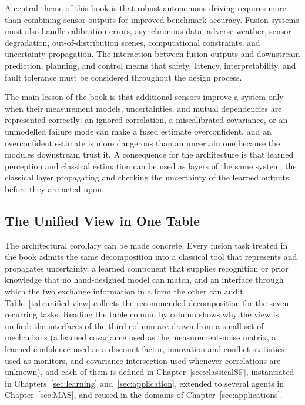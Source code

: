 A central theme of this book is that robust autonomous driving requires more than combining sensor outputs for improved benchmark accuracy. Fusion systems must also handle calibration errors, asynchronous data, adverse weather, sensor degradation, out-of-distribution scenes, computational constraints, and uncertainty propagation. The interaction between fusion outputs and downstream prediction, planning, and control means that safety, latency, interpretability, and fault tolerance must be considered throughout the design process.

The main lesson of the book is that additional sensors improve a system only when their measurement models, uncertainties, and mutual dependencies are represented correctly: an ignored correlation, a miscalibrated covariance, or an unmodelled failure mode can make a fused estimate overconfident, and an overconfident estimate is more dangerous than an uncertain one because the modules downstream trust it. A consequence for the architecture is that learned perception and classical estimation can be used as layers of the same system, the classical layer propagating and checking the uncertainty of the learned outputs before they are acted upon.

\subsection*{The Unified View in One Table}

The architectural corollary can be made concrete. Every fusion task treated in the book admits the same decomposition into a classical tool that represents and propagates uncertainty, a learned component that supplies recognition or prior knowledge that no hand-designed model can match, and an interface through which the two exchange information in a form the other can audit. Table~\ref{tab:unified-view} collects the recommended decomposition for the seven recurring tasks. Reading the table column by column shows why the view is unified: the interfaces of the third column are drawn from a small set of mechanisms (a learned covariance used as the measurement-noise matrix, a learned confidence used as a discount factor, innovation and conflict statistics used as monitors, and covariance intersection used whenever correlations are unknown), and each of them is defined in Chapter~\ref{sec:classicalSF}, instantiated in Chapters~\ref{sec:learning} and~\ref{sec:application}, extended to several agents in Chapter~\ref{sec:MAS}, and reused in the domains of Chapter~\ref{sec:applications}.

